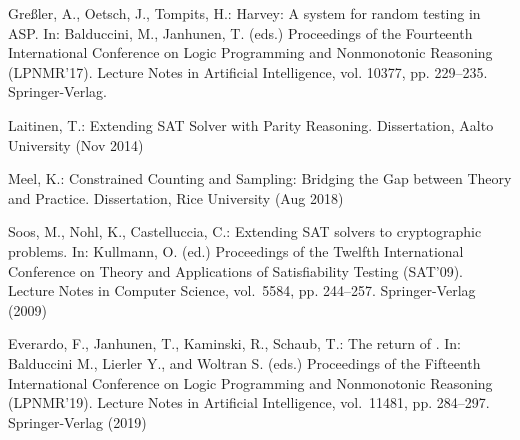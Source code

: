 \begin{thebibliography}{10}

  Gre{\ss}ler, A., Oetsch, J., Tompits, H.:
  Harvey: A system for random testing in {ASP}. In: Balduccini, M., Janhunen, T. (eds.) Proceedings of the Fourteenth International Conference on
  Logic Programming and Nonmonotonic Reasoning (LPNMR'17). Lecture Notes in Artificial Intelligence, vol. 10377, pp. 229--235. Springer-Verlag.%



  Laitinen, T.:
  Extending {SAT} Solver with Parity Reasoning. Dissertation, Aalto University (Nov 2014)

  Meel, K.:
  Constrained Counting and Sampling: Bridging the Gap between Theory and Practice. Dissertation, Rice University (Aug 2018)



  Soos, M., Nohl, K., Castelluccia, C.:
  Extending {SAT} solvers to cryptographic problems. In: Kullmann, O. (ed.) Proceedings of the Twelfth International Conference on Theory and
  Applications of Satisfiability Testing (SAT'09).  Lecture Notes in Computer Science, vol.~5584, pp. 244--257. Springer-Verlag (2009)

  Everardo, F., Janhunen, T., Kaminski, R., Schaub, T.:
  The return of \xorro{}. In: Balduccini M., Lierler Y., and Woltran S. (eds.) Proceedings of the Fifteenth International Conference on Logic
  Programming and Nonmonotonic Reasoning (LPNMR'19). Lecture Notes in Artificial Intelligence, vol.~11481, pp. 284--297. Springer-Verlag (2019)


\end{thebibliography}
